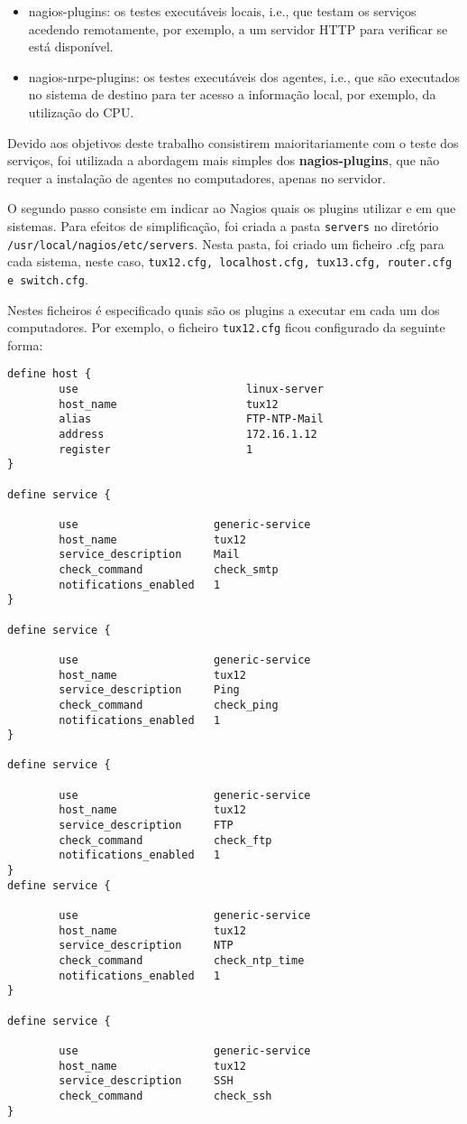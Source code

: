 \begin{itemize}
    \item nagios-plugins: os testes executáveis locais, i.e., que testam os serviços acedendo remotamente, por exemplo, a um servidor HTTP para verificar se está disponível.
    \item nagios-nrpe-plugins: os testes executáveis dos agentes, i.e., que são executados no sistema de destino para ter acesso a informação local, por exemplo, da utilização do CPU.
\end{itemize}

Devido aos objetivos deste trabalho consistirem maioritariamente com o teste dos serviços, foi utilizada a abordagem mais simples dos \textbf{nagios-plugins},
que não requer a instalação de agentes no computadores, apenas no servidor.

O segundo passo consiste em indicar ao Nagios quais os plugins utilizar e em que sistemas.
Para efeitos de simplificação, foi criada a pasta \verb|servers| no diretório \verb|/usr/local/nagios/etc/servers|.
Nesta pasta, foi criado um ficheiro .cfg para cada sistema, neste caso, \verb|tux12.cfg, localhost.cfg, tux13.cfg, router.cfg e switch.cfg|.

Nestes ficheiros é especificado quais são os plugins a executar em cada um dos computadores.
Por exemplo, o ficheiro \verb|tux12.cfg| ficou configurado da seguinte forma:

\pagebreak

\begin{lstlisting}
define host {
        use                          linux-server
        host_name                    tux12
        alias                        FTP-NTP-Mail
        address                      172.16.1.12
        register                     1
}

define service {

        use                     generic-service
        host_name               tux12
        service_description     Mail
        check_command           check_smtp
        notifications_enabled   1
}

define service {

        use                     generic-service
        host_name               tux12
        service_description     Ping
        check_command           check_ping
        notifications_enabled   1
}

define service {

        use                     generic-service
        host_name               tux12
        service_description     FTP
        check_command           check_ftp
        notifications_enabled   1
}
define service {

        use                     generic-service
        host_name               tux12
        service_description     NTP
        check_command           check_ntp_time
        notifications_enabled   1
}

define service {

        use                     generic-service
        host_name               tux12
        service_description     SSH
        check_command           check_ssh
}

\end{lstlisting}

